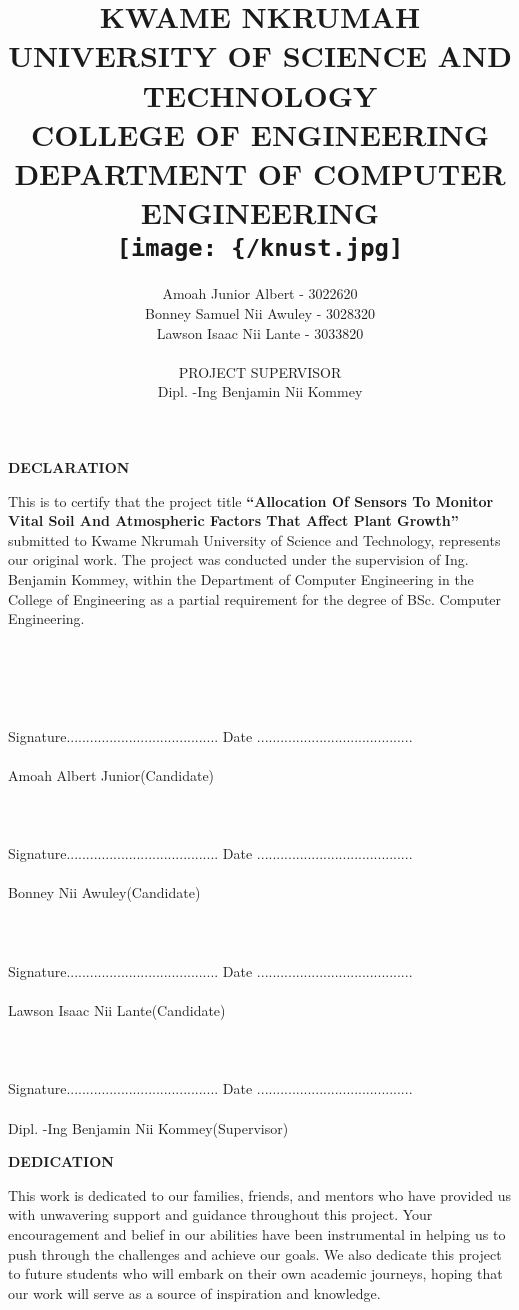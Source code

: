 \documentclass[12pt, a4paper]{article}
\title{KWAME NKRUMAH UNIVERSITY OF SCIENCE AND TECHNOLOGY\\
COLLEGE OF ENGINEERING\\
DEPARTMENT OF COMPUTER ENGINEERING\\ 
\texttt{[image: \{/knust.jpg]}} 
\\ALLOCATION OF SENSORS TO MONITOR VITAL SOIL AND ATMOSPHERIC FACTORS THAT AFFECT PLANT GROWTH\\ Case Study: KNUST Peasant Farms}
\author{Amoah Junior Albert - 3022620\\ Bonney Samuel Nii Awuley - 3028320 \\ Lawson Isaac Nii Lante - 3033820 \\ \\ PROJECT SUPERVISOR\\ Dipl. -Ing Benjamin Nii Kommey}
\begin{document}
\maketitle
\thispagestyle{empty}
\newpage

\begin{center}
\textbf{DECLARATION}
\end{center}
This is to certify that the project title \textbf{``Allocation Of Sensors To Monitor Vital Soil And Atmospheric Factors That Affect Plant Growth''} submitted to Kwame Nkrumah University of Science and Technology, represents our original work. The project was conducted under the supervision of Ing. Benjamin Kommey, within the Department of Computer Engineering in the College of Engineering as a partial requirement for the degree of BSc. Computer Engineering.\\ \\ \\  \\ \\ \\
Signature....................................... Date ........................................\\ \\
Amoah Albert Junior(Candidate)\\ \\ \\ \\
Signature....................................... Date ........................................\\ \\
Bonney Nii Awuley(Candidate)\\ \\  \\ \\
Signature....................................... Date ........................................\\ \\
Lawson Isaac Nii Lante(Candidate)\\ \\ \\ \\
Signature....................................... Date ........................................\\ \\
Dipl. -Ing Benjamin Nii Kommey(Supervisor)
\newpage

\begin{center}
\textbf{DEDICATION}
\end{center}
This work is dedicated to our families, friends, and mentors who have provided us with unwavering support and guidance throughout this project. Your encouragement and belief in our abilities have been instrumental in helping us to push through the challenges and achieve our goals. We also dedicate this project to future students who will embark on their own academic journeys, hoping that our work will serve as a source of inspiration and knowledge.
\newpage
\end{document}
